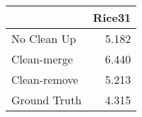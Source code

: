 \begin{tabular}{lr}
\toprule
{} & Rice31 \\
\midrule
No Clean Up  &  5.182 \\
Clean-merge  &  6.440 \\
Clean-remove &  5.213 \\
Ground Truth &  4.315 \\
\bottomrule
\end{tabular}
